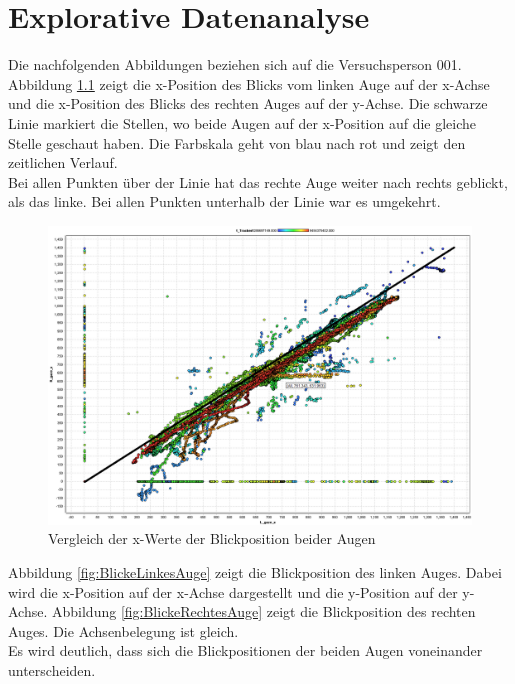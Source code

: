 \chapter{Explorative Datenanalyse}
Die nachfolgenden Abbildungen beziehen sich auf die Versuchsperson 001.\\
Abbildung \ref{fig:AugenX-Positionen} zeigt die x-Position des Blicks vom linken Auge auf der x-Achse und die x-Position des Blicks des rechten Auges auf der y-Achse. Die schwarze Linie markiert die Stellen, wo beide Augen auf der x-Position auf die gleiche Stelle geschaut haben. Die Farbskala geht von blau nach rot und zeigt den zeitlichen Verlauf.\\
Bei allen Punkten \"uber der Linie hat das rechte Auge weiter nach rechts geblickt, als das linke. Bei allen Punkten unterhalb der Linie war es umgekehrt.

\begin{figure}[H]
	\noindent \begin{centering}
		\includegraphics[width=15cm]{pics/Augen-X-Positionen.png}
		\par\end{centering}
	\caption{\label{fig:AugenX-Positionen}Vergleich der x-Werte der Blickposition beider Augen}
\end{figure}

Abbildung \ref{fig:BlickeLinkesAuge} zeigt die Blickposition des linken Auges. Dabei wird die x-Position auf der x-Achse dargestellt und die y-Position auf der y-Achse. Abbildung \ref{fig:BlickeRechtesAuge} zeigt die Blickposition des rechten Auges. Die Achsenbelegung ist gleich.\\
Es wird deutlich, dass sich die Blickpositionen der beiden Augen voneinander unterscheiden.

